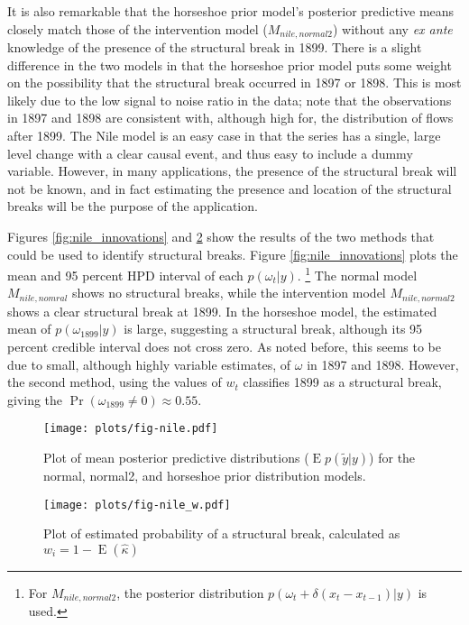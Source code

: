 \documentclass{article}
\DeclareMathOperator{\E}{E}
\begin{document}
It is also remarkable that the horseshoe prior model's posterior predictive means closely match those of the intervention model ($M_{nile,normal2}$) without any \textit{ex ante} knowledge of the presence of the structural break in 1899.
There is a slight difference in the two models in that the horseshoe prior model puts some weight on the possibility that the structural break occurred in 1897 or 1898.
This is most likely due to the low signal to noise ratio in the data; note that the observations in 1897 and 1898 are consistent with, although high for, the distribution of flows after 1899.
The Nile model is an easy case in that the series has a single, large level change with a clear causal event, and thus easy to include a dummy variable.
However, in many applications, the presence of the structural break will not be known, and in fact estimating the presence and location of the structural breaks will be the purpose of the application.

Figures \ref{fig:nile_innovations} and \ref{fig:nile_w} show the results of the two methods that could be used to identify structural breaks. 
Figure \ref{fig:nile_innovations} plots the mean and 95 percent HPD interval of each $p(\omega_{t} | y)$.%
\footnote{For $M_{nile,normal2}$, the posterior distribution $p(\omega_{t} + \delta (x_{t} - x_{t-1}) | y)$ is used.}
The normal model $M_{nile,nomral}$ shows no structural breaks, while the intervention model $M_{nile,normal2}$ shows a clear structural break at 1899.
In the horseshoe model, the estimated mean of $p(\omega_{1899} | y)$ is large, suggesting a structural break, although its 95 percent credible interval does not cross zero.
As noted before, this seems to be due to small, although highly variable estimates, of $\omega$ in 1897 and 1898.
However, the second method, using the values of $w_{t}$ classifies 1899 as a structural break, giving the $\Pr(\omega_{1899} \neq 0) \approx 0.55$.

\begin{figure}[htpb]
  \centering
  \texttt{[image: plots/fig-nile.pdf]}
  \caption{Plot of mean posterior predictive distributions ($\E p(\tilde{y}| y)$) for the normal, normal2, and horseshoe prior distribution models.}
  \label{fig:nile}
\end{figure}

\begin{figure}[htpb]
  \centering
  \texttt{[image: plots/fig-nile\_w.pdf]}
  \caption{Plot of estimated probability of a structural break, calculated as $w_{i} = 1 - \E(\hat{\kappa})$}
  \label{fig:nile_w}
\end{figure}
\end{document}
